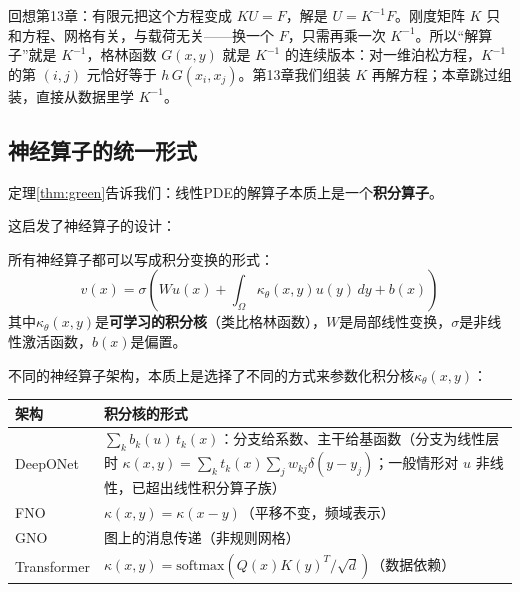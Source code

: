 回想第13章：有限元把这个方程变成 $KU = F$，解是 $U = K^{-1}F$。刚度矩阵 $K$ 只和方程、网格有关，与载荷无关——换一个 $F$，只需再乘一次 $K^{-1}$。所以“解算子”就是 $K^{-1}$，格林函数 $G(x, y)$ 就是 $K^{-1}$ 的连续版本：对一维泊松方程，$K^{-1}$ 的第 $(i, j)$ 元恰好等于 $h\, G(x_i, x_j)$。第13章我们组装 $K$ 再解方程；本章跳过组装，直接从数据里学 $K^{-1}$。

\subsection{神经算子的统一形式}

定理\ref{thm:green}告诉我们：线性PDE的解算子本质上是一个\textbf{积分算子}。

这启发了神经算子的设计：

\begin{keyformula}[title=神经算子的核心形式]
所有神经算子都可以写成积分变换的形式：
\begin{equation}
    v(x) = \sigma\left( Wu(x) + \int_\Omega \kappa_\theta(x, y) u(y) \, dy + b(x) \right)
\end{equation}
其中$\kappa_\theta(x, y)$是\textbf{可学习的积分核}（类比格林函数），$W$是局部线性变换，$\sigma$是非线性激活函数，$b(x)$是偏置。
\end{keyformula}

\begin{unification}[title=不同神经算子架构的统一]
不同的神经算子架构，本质上是选择了不同的方式来参数化积分核$\kappa_\theta(x, y)$：

\begin{center}
\small
\begin{tabularx}{\linewidth}{l|>{\raggedright\arraybackslash}X}
\toprule
\textbf{架构} & \textbf{积分核的形式} \\
\midrule
DeepONet & $\sum_k b_k(u)\, t_k(x)$：分支给系数、主干给基函数（分支为线性层时 $\kappa(x,y) = \sum_k t_k(x) \sum_j w_{kj}\delta(y - y_j)$；一般情形对 $u$ 非线性，已超出线性积分算子族） \\
FNO & $\kappa(x, y) = \kappa(x - y)$（平移不变，频域表示） \\
GNO & 图上的消息传递（非规则网格） \\
Transformer & $\kappa(x, y) = \text{softmax}(Q(x)K(y)^T / \sqrt{d})$（数据依赖） \\
\bottomrule
\end{tabularx}
\end{center}
\end{unification}

